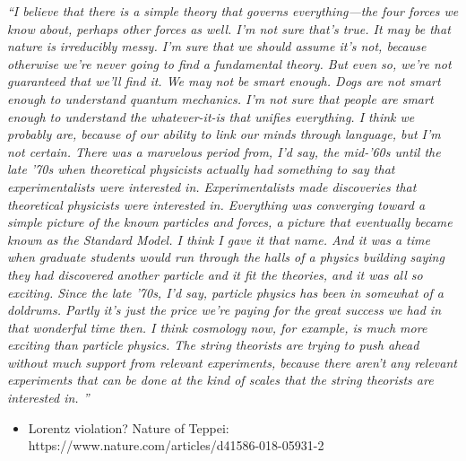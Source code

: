 \begin{center}
\begin{minipage}[5cm]{0.9\textwidth}
\textit{``I believe that there is a simple theory that governs everything—the four forces we know about, perhaps other forces as well. I'm not sure that's true. It may be that nature is irreducibly messy. I'm sure that we should assume it's not, because otherwise we're never going to find a fundamental theory. But even so, we're not guaranteed that we'll find it. We may not be smart enough. Dogs are not smart enough to understand quantum mechanics. I'm not sure that people are smart enough to understand the whatever-it-is that unifies everything. I think we probably are, because of our ability to link our minds through language, but I'm not certain. \newline \indent There was a marvelous period from, I'd say, the mid-'60s until the late '70s when theoretical physicists actually had something to say that experimentalists were interested in. Experimentalists made discoveries that theoretical physicists were interested in. Everything was converging toward a simple picture of the known particles and forces, a picture that eventually became known as the Standard Model. I think I gave it that name. And it was a time when graduate students would run through the halls of a physics building saying they had discovered another particle and it fit the theories, and it was all so exciting. \newline \indent Since the late '70s, I'd say, particle physics has been in somewhat of a doldrums. Partly it's just the price we're paying for the great success we had in that wonderful time then. I think cosmology now, for example, is much more exciting than particle physics. The string theorists are trying to push ahead without much support from relevant experiments, because there aren't any relevant experiments that can be done at the kind of scales that the string theorists are interested in. ''}
\end{minipage} 
\end{center}


\begin{itemize}

\item Lorentz violation? Nature of Teppei: https://www.nature.com/articles/d41586-018-05931-2
\end{itemize}
